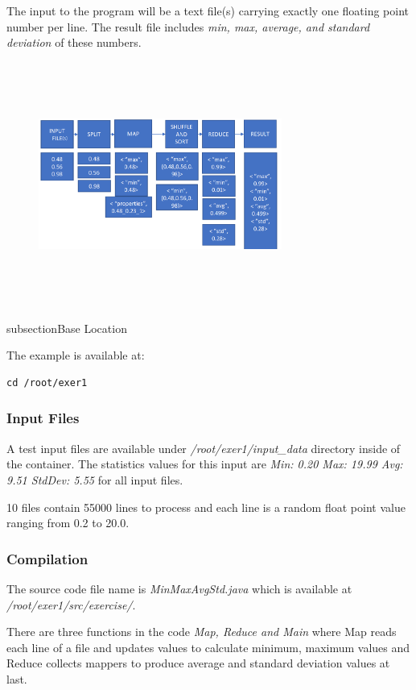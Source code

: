 The input to the program will be a text file(s) carrying exactly one
floating point number per line. The result file includes \textit{min,
  max, average, and standard deviation} of these numbers.


  \begin{figure}[!htbp]
    \includegraphics[width=8cm,height=8cm]{section/container/exer1.png}
    \centering
  \end{figure}

\sub subsection{Base Location}

The example is available at:

\begin{lstlisting}
cd /root/exer1
\end{lstlisting}

\subsubsection{Input Files}

A test input files are available under \textit{/root/exer1/input_data}
directory inside of the container.  The statistics values for this input are
\textit{Min: 0.20 Max: 19.99 Avg:  9.51 StdDev: 5.55} for all input files.

10 files contain 55000 lines to process and each line is a random float point
value ranging from 0.2 to 20.0.

\subsubsection{Compilation}

The source code file name is \textit{MinMaxAvgStd.java} which is available at
\textit{/root/exer1/src/exercise/}.

There are three functions in the code \textit{Map, Reduce and Main} where Map
reads each line of a file and updates values to calculate minimum, maximum
values and Reduce collects mappers to produce average and standard deviation
values at last.


